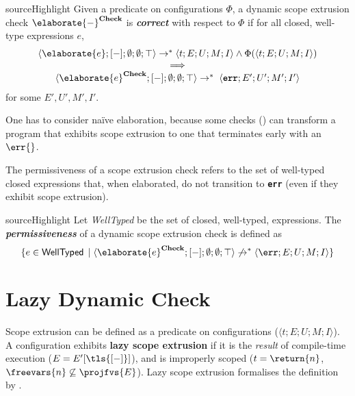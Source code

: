 \begin{definition}{sourceHighlight}
 Given a predicate on configurations $\Phi$, a dynamic scope extrusion check $\elaborate{-}^{\textbf{Check}}$ is \textbf{\emph{correct}} with respect to $\Phi$ if for all closed, well-type \sourceLang{} expressions $e$,
 \[\begin{array}{c} \langle \elaborate{e} ; [-]; \emptyset;\emptyset; \top \rangle \to^{*} \langle t;E;U;M;I \rangle \land \Phi(\langle t;E;U;M;I \rangle)
\\ \implies \\
\langle \elaborate{e}^{\textbf{Check}} ; [-]; \emptyset;\emptyset; \top \rangle  \to^{*} \; \langle \textbf{\texttt{err}};E';U';M';I' \rangle
 \end{array}
 \]
 for some $E', U', M', I'$. 
\end{definition}

One has to consider naïve elaboration, because some checks () can transform a program that exhibits scope extrusion to one that terminates early with an $\err{}$.

The permissiveness of a scope extrusion check refers to the set of well-typed closed \sourceLang{} expressions that, when elaborated, do not transition to \textbf{\texttt{err}} (even if they exhibit scope extrusion).

\begin{definition}{sourceHighlight}
 Let \emph{\textsf{WellTyped}} be the set of closed, well-typed, \sourceLang{} expressions.
 The \emph{\textbf{permissiveness}} of a dynamic scope extrusion check is defined as 
 \[\{ e \in \textsf{WellTyped}\, \mid \langle \elaborate{e}^{\textbf{Check}};[-];\emptyset;\emptyset;\top \rangle \not\to^{*} \langle \err ; E ; U ; M ; I \rangle \} \]
\end{definition}

\section{Lazy Dynamic Check}\label{section:lazy-dynamic-check-formal}
Scope extrusion can be defined as a predicate on \coreLang{} configurations ($\langle t;E;U;M;I\rangle$). A configuration exhibits \textbf{lazy scope extrusion} if it is the \textit{result} of compile-time execution ($E = E'[\tls{[-]}]$), and is improperly scoped ($t = \return{n}$, $\freevars{n} \not\subseteq \projfvs{E}$). Lazy scope extrusion formalises the definition by \citet{kiselyov-14}.


